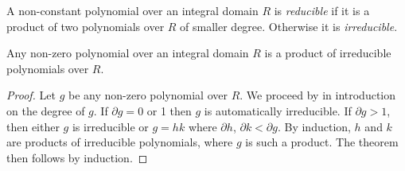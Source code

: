 %
%    




\begin{definition}
     A non-constant polynomial over an integral domain $R$ is \textit{reducible} if it is a product of two polynomials over $R$ of smaller degree. Otherwise it is \textit{irreducible}.
\end{definition}

\begin{theorem}
    Any non-zero polynomial over an integral domain $R$ is a product of irreducible polynomials over $R$.
\end{theorem}

\begin{proof}
    Let $g$ be any non-zero polynomial over $R$. We proceed by in introduction on the degree of $g$. If $\partial g = 0$ or 1 then $g$ is automatically irreducible. If $\partial g > 1$, then either $g$ is irreducible or $g = hk$ where $\partial h$, $\partial k < \partial g$. By induction, $h$ and $k$ are products of irreducible polynomials, where $g$ is such a product. The theorem then follows by induction.
\end{proof}

